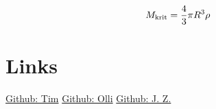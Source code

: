 \documentclass[a4paper,12pt]{article}
\begin{document}
\begin{equation}
    \fontsize{20}{10}
    M_\text{krit} = \frac{4}{3} \pi R^3 \rho
    \label{eq:kritische_masse}
\end{equation}

\newpage

\section{Links}
\begin{center}
\end{center}
\bigskip

\href{https://github.com/Tim-foe}{Github: Tim} \hspace{4cm}
\href{https://github.com/YoOlli}{Github: Olli} \hspace{4cm}
\href{https://github.com/Jason4225}{Github: J. Z.}

%
%
\end{document}
